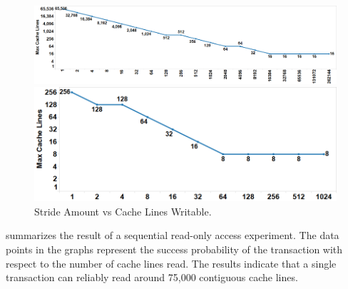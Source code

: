 \begin{figure}[h]
\centering
\begin{minipage}[b]{.45\linewidth}
\centering
\includegraphics[width=\linewidth]{images/wttm_stride_read_intel}
\caption{Stride Amount vs Cache Lines Readable. 
}
\label{fig:wttm_stride_read_intel}
\end{minipage}%
\quad
\begin{minipage}[b]{.45\linewidth}
\centering
\includegraphics[width=\linewidth]{images/wttm_stride_write_intel}
\caption{Stride Amount vs Cache Lines Writable. 
}
\label{fig:wttm_stride_write_intel}
\end{minipage}
\end{figure}

 summarizes the result of a sequential
read-only access experiment. The data points in the graphs represent the success
probability of the transaction with respect to the number of cache lines read.
The results indicate that a single transaction can reliably read 
around 75,000 contiguous cache lines.


